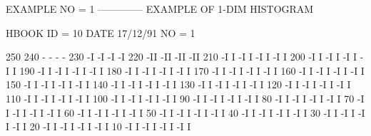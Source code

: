 \begin{Listing}
 EXAMPLE NO = 1                                                                  
 --------------                                                                  
 EXAMPLE OF 1-DIM HISTOGRAM                                                      
 
 HBOOK     ID =        10                                        DATE  17/12/91              NO =   1
 
      250
      240                              -                        -                        -                        -
      230                             -I                       -I                       -I                       -I
      220                            -II                      -II                      -II                      -II
      210                           -I I                     -I I                     -I I                     -I I
      200                          -I  I                    -I  I                    -I  I                    -I  I
      190                         -I   I                   -I   I                   -I   I                   -I   I
      180                        -I    I                  -I    I                  -I    I                  -I    I
      170                       -I     I                 -I     I                 -I     I                 -I     I
      160                      -I      I                -I      I                -I      I                -I      I
      150                     -I       I               -I       I               -I       I               -I       I
      140                    -I        I              -I        I              -I        I              -I        I
      130                   -I         I             -I         I             -I         I             -I         I
      120                  -I          I            -I          I            -I          I            -I          I
      110                 -I           I           -I           I           -I           I           -I           I
      100                -I            I          -I            I          -I            I          -I            I
       90               -I             I         -I             I         -I             I         -I             I
       80              -I              I        -I              I        -I              I        -I              I
       70             -I               I       -I               I       -I               I       -I               I
       60            -I                I      -I                I      -I                I      -I                I
       50           -I                 I     -I                 I     -I                 I     -I                 I
       40          -I                  I    -I                  I    -I                  I    -I                  I
       30         -I                   I   -I                   I   -I                   I   -I                   I
       20        -I                    I  -I                    I  -I                    I  -I                    I
       10       -I                     I -I                     I -I                     I -I                     I
 

\end{Listing}
